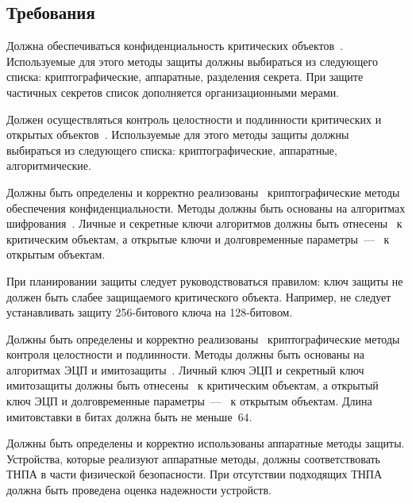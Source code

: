 \subsection{Требования}\label{DP.Reqs}

\label{R.DP.Crit} %
Должна обеспечиваться конфиденциальность критических объектов~.
%
Используемые для этого методы защиты должны выбираться из следующего списка:
криптографические, аппаратные, разделения секрета.
%
При защите частичных секретов список дополняется организационными мерами.

\label{R.DP.Public} %
Должен осуществляться контроль целостности и подлинности критических и открытых
объектов~. 
%
Используемые для этого методы защиты должны выбираться из следующего списка: 
криптографические, аппаратные, алгоритмические.

\label{R.DP.CryptoE} %
Должны быть определены и корректно 
реализованы~ 
криптографические методы обеспечения конфиденциальности.
%
Методы должны быть основаны на алгоритмах шифрования~.
%
Личные и секретные ключи алгоритмов должны быть 
отнесены~ к критическим объектам, а открытые 
ключи и долговременные параметры~--- ~к открытым объектам. 

\begin{note}
При планировании защиты следует руководствоваться правилом:
ключ защиты не должен быть слабее защищаемого критического объекта. 
%
Например, не следует устанавливать защиту 256-битового ключа на 128-битовом. 
\end{note}

\label{R.DP.CryptoI} %
Должны быть определены и корректно 
реализованы~ 
криптографические методы контроля
целостности и подлинности. Методы должны быть основаны на алгоритмах 
ЭЦП и имитозащиты~.
%
Личный ключ ЭЦП и секретный ключ имитозащиты должны быть 
отнесены~ к критическим объектам, а открытый ключ ЭЦП и 
долговременные параметры~--- ~к открытым объектам.
%
Длина имитовставки в битах должна быть не меньше~$64$.

\label{R.DP.Hard} %
Должны быть определены и корректно использованы аппаратные методы защиты.
Устройства, которые реализуют аппаратные методы, 
должны соответствовать ТНПА в части физической безопасности.
%
При отсутствии подходящих ТНПА должна быть проведена оценка надежности
устройств.

